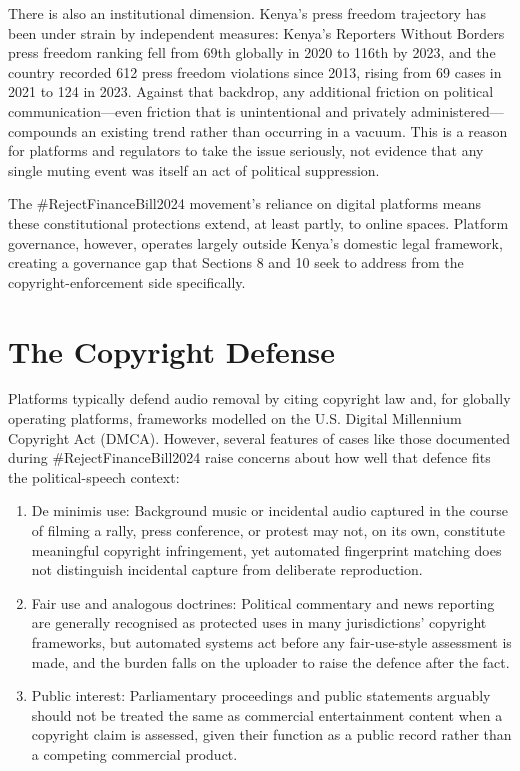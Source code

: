 \documentclass{article}
\begin{document}
There is also an institutional dimension. Kenya's press freedom trajectory has been under strain by independent measures: Kenya's Reporters Without Borders press freedom ranking fell from 69th globally in 2020 to 116th by 2023,\cite{cipesa2025} and the country recorded 612 press freedom violations since 2013, rising from 69 cases in 2021 to 124 in 2023.\cite{cipesa2025} Against that backdrop, any additional friction on political communication—even friction that is unintentional and privately administered—compounds an existing trend rather than occurring in a vacuum. This is a reason for platforms and regulators to take the issue seriously, not evidence that any single muting event was itself an act of political suppression.

The \#RejectFinanceBill2024 movement's reliance on digital platforms means these constitutional protections extend, at least partly, to online spaces. Platform governance, however, operates largely outside Kenya's domestic legal framework, creating a governance gap that Sections 8 and 10 seek to address from the copyright-enforcement side specifically.

\section{The Copyright Defense}

Platforms typically defend audio removal by citing copyright law and, for globally operating platforms, frameworks modelled on the U.S. Digital Millennium Copyright Act (DMCA). However, several features of cases like those documented during \#RejectFinanceBill2024 raise concerns about how well that defence fits the political-speech context:

\begin{enumerate}
\item De minimis use: Background music or incidental audio captured in the course of filming a rally, press conference, or protest may not, on its own, constitute meaningful copyright infringement, yet automated fingerprint matching does not distinguish incidental capture from deliberate reproduction.
\item Fair use and analogous doctrines: Political commentary and news reporting are generally recognised as protected uses in many jurisdictions' copyright frameworks, but automated systems act before any fair-use-style assessment is made, and the burden falls on the uploader to raise the defence after the fact.
\item Public interest: Parliamentary proceedings and public statements arguably should not be treated the same as commercial entertainment content when a copyright claim is assessed, given their function as a public record rather than a competing commercial product.
\end{enumerate}
\end{document}
